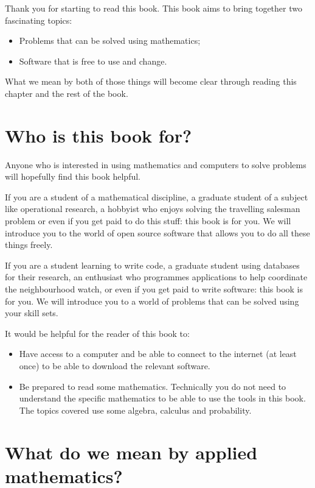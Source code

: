 Thank you for starting to read this book. This book aims to bring
together two fascinating topics:

\begin{itemize}
\item
  Problems that can be solved using mathematics;
\item
  Software that is free to use and change.
\end{itemize}

What we mean by both of those things will become clear through reading
this chapter and the rest of the book.

\section{Who is this book for?}\label{sec:who-is-this-book-for}

Anyone who is interested in using mathematics and computers to solve
problems will hopefully find this book helpful.


If you are a student of a mathematical discipline, a graduate student of
a subject like operational research, a hobbyist who enjoys solving the
travelling salesman problem or even if you get paid to do this stuff:
this book is for you. We will introduce you to the world of open source
software that allows you to do all these things freely.

If you are a student learning to write code, a graduate student using
databases for their research, an enthusiast who programmes applications
to help coordinate the neighbourhood watch, or even if you get paid to
write software: this book is for you. We will introduce you to a world
of problems that can be solved using your skill sets.

It would be helpful for the reader of this book to:

\begin{itemize}
\item
  Have access to a computer and be able to connect to the internet (at
  least once) to be able to download the relevant software.
\item
  Be prepared to read some mathematics. Technically you do not need to
  understand the specific mathematics to be able to use the tools in this book.
  The topics covered use some algebra, calculus and probability.
\end{itemize}

\section{What do we mean by applied
mathematics?}\label{sec:what-do-we-mean-by-applied-mathematics}

